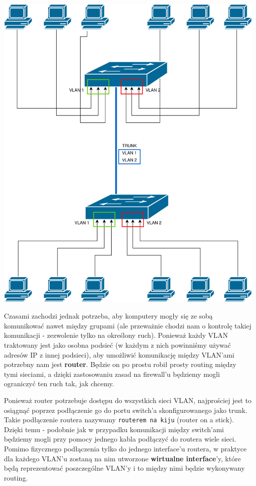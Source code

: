 \documentclass[12pt]{article}
\begin{document}
    \bigskip
    \includegraphics[width=\linewidth]{vlan/two_switches_with_trunk.png}
    \bigskip

    \newpage
    Czasami zachodzi jednak potrzeba, aby komputery mogły się ze sobą komunikować nawet między grupami (ale przeważnie chodzi nam o kontrolę takiej komunikacji
    - zezwolenie tylko na określony ruch). Ponieważ każdy VLAN traktowany jest jako osobna podsieć (w każdym z nich powinniśmy używać adresów IP z innej podsieci),
    aby umożliwić komunikację między VLAN'ami potrzebny nam jest \textbf{router}. Będzie on po prostu robił prosty routing między tymi sieciami, a dzięki zastosowaniu
    zasad na firewall'u będziemy mogli ograniczyć ten ruch tak, jak chcemy.

    Ponieważ router potrzebuje dostępu do wszystkich sieci VLAN, najprościej jest to osiągnąć poprzez podłączenie go do portu switch'a skonfigurowanego jako trunk.
    Takie podłączenie routera nazywamy \texttt{routerem na kiju} (router on a stick).
    Dzięki temu - podobnie jak w przypadku komunikacji między switch'ami będziemy mogli przy pomocy jednego kabla podłączyć do routera wiele sieci. Pomimo fizycznego
    podłączenia tylko do jednego interface'u routera, w praktyce dla każdego VLAN'u zostaną na nim utworzone \textbf{wirtualne interface}'y,
    które będą reprezentować poszczególne VLAN'y i to między nimi będzie wykonywany routing.
\end{document}
